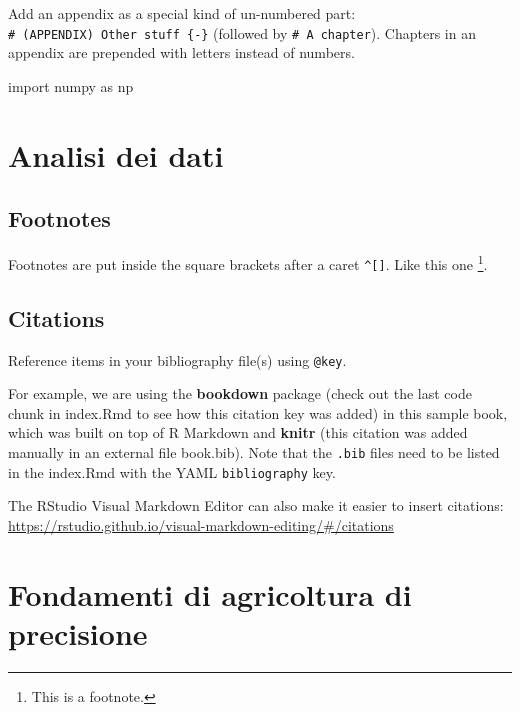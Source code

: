 \documentclass[
]{book}
\newenvironment{Shaded}{\begin{snugshade}}{\end{snugshade}}
\newcommand{\ImportTok}[1]{#1}
\newcommand{\NormalTok}[1]{#1}
\theoremstyle{definition}
\theoremstyle{definition}
\theoremstyle{definition}
\theoremstyle{definition}
\theoremstyle{remark}
\begin{document}
Add an appendix as a special kind of un-numbered part: \texttt{\#\ (APPENDIX)\ Other\ stuff\ \{-\}} (followed by \texttt{\#\ A\ chapter}). Chapters in an appendix are prepended with letters instead of numbers.

\begin{Shaded}
\begin{Highlighting}[]
\ImportTok{import}\NormalTok{ numpy }\ImportTok{as}\NormalTok{ np}
\end{Highlighting}
\end{Shaded}

\hypertarget{analisi-dei-dati}{%
\chapter{Analisi dei dati}\label{analisi-dei-dati}}

\hypertarget{footnotes}{%
\section{Footnotes}\label{footnotes}}

Footnotes are put inside the square brackets after a caret \texttt{\^{}{[}{]}}. Like this one \footnote{This is a footnote.}.

\hypertarget{citations}{%
\section{Citations}\label{citations}}

Reference items in your bibliography file(s) using \texttt{@key}.

For example, we are using the \textbf{bookdown} package \citep{R-bookdown} (check out the last code chunk in index.Rmd to see how this citation key was added) in this sample book, which was built on top of R Markdown and \textbf{knitr} \citep{xie2015} (this citation was added manually in an external file book.bib). Note that the \texttt{.bib} files need to be listed in the index.Rmd with the YAML \texttt{bibliography} key.

The RStudio Visual Markdown Editor can also make it easier to insert citations: \url{https://rstudio.github.io/visual-markdown-editing/\#/citations}

\hypertarget{fondamenti-di-agricoltura-di-precisione}{%
\chapter{Fondamenti di agricoltura di precisione}\label{fondamenti-di-agricoltura-di-precisione}}
\end{document}
